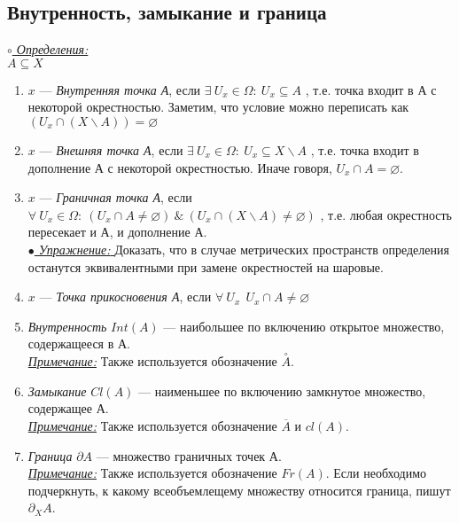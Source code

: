 \documentclass{article}
\begin{document}
\begin{spacing}{1.5}
\section{Внутренность, замыкание и граница}
\underline{\textit{$\circ$ Определения:}}\\
$A\subseteq X$
\begin{enumerate}
\item $x$ --- \emph{Внутренняя точка А}, если $\exists ~U_{x}\in\Omega:~U_{x}\subseteq A$ , т.е. точка входит в А с некоторой окрестностью. Заметим, что условие можно переписать как $(U_{x}\cap(X\backslash A))=\varnothing$
\item $x$ --- \emph{Внешняя точка А}, если $\exists ~U_{x}\in\Omega:~U_{x}\subseteq X\backslash A$ , т.е. точка входит в дополнение А с некоторой окрестностью. Иначе говоря, $U_{x}\cap A=\varnothing$.
\item $x$ --- \emph{Граничная точка А}, если $\forall ~U_{x}\in\Omega:~(U_{x}\cap A\neq\varnothing) ~\& ~ (U_{x}\cap(X\backslash A)\neq\varnothing)$ , т.е. любая окрестность пересекает и А, и дополнение А.
\\ \underline{\emph{$\bullet$ Упражнение: }} Доказать, что в случае метрических пространств определения останутся эквивалентными при замене окрестностей на шаровые.
\item $x$ --- \emph{Точка прикосновения А}, если $\forall~U_{x}~~U_{x}\cap A\neq \varnothing$
\item \emph{Внутренность} $Int(A)$ --- наибольшее по включению открытое множество, содержащееся в А.
\\ \underline{\emph{Примечание:}} Также используется обозначение $\overset{\circ}{A}$.
\item \emph{Замыкание} $Cl(A)$ --- наименьшее по включению замкнутое множество, содержащее А.
\\ \underline{\emph{Примечание:}} Также используется обозначение $\overline{A}$ и $cl(A)$.
\item \emph{Граница} $\partial A$ --- множество граничных точек А. 
\\ \underline{\emph{Примечание:}} Также используется обозначение $Fr(A)$. Если необходимо подчеркнуть, к какому всеобъемлещему множеству относится граница, пишут $\partial_{X}A$.
\end{enumerate}

\end{spacing}
\end{document}
